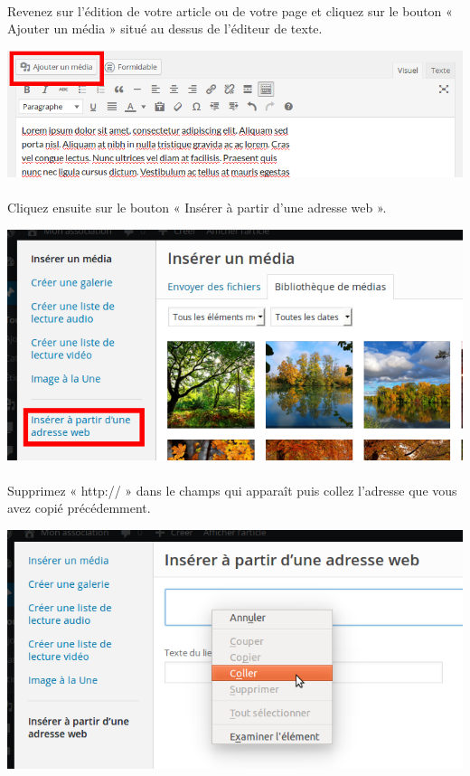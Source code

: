 \documentclass[10pt,a4paper]{article}
\begin{document}
\paragraph{}Revenez sur l'édition de votre article ou de votre page et cliquez sur le bouton « Ajouter un média » situé au dessus de l'éditeur de texte.
\begin{center}
\includegraphics[scale=0.3]{img/0102.png}
\end{center}
\paragraph{}Cliquez ensuite sur le bouton « Insérer à partir d'une adresse web ».
\begin{center}
\includegraphics[scale=0.3]{img/0133.png}
\end{center}
\newpage
\paragraph{}Supprimez « http:// » dans le champs qui apparaît puis collez l'adresse que vous avez copié précédemment.
\begin{center}
\includegraphics[scale=0.3]{img/0134.png}
\end{center}
\end{document}
